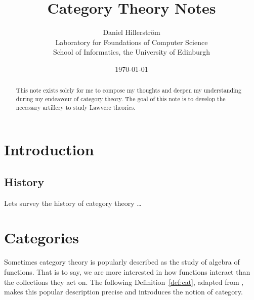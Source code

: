 \documentclass[10pt,twoside,a4paper]{article}
\author{Daniel Hillerström\\\small{Laboratory for Foundations of Computer Science}\\\small{School of Informatics, the University of Edinburgh}}
\title{\bfseries Category Theory Notes}
\date{\today}
\theoremstyle{plain}
\theoremstyle{definition}
\begin{document}
\maketitle
\begin{abstract}
  This note exists solely for me to compose my thoughts and deepen my
  understanding during my endeavour of category theory.  The goal of
  this note is to develop the necessary artillery to study Lawvere
  theories.
\end{abstract}

%
%
\setcounter{tocdepth}{2}
\tableofcontents

%
%
\section{Introduction}
\label{sec:intro}
\subsection{History}
Lets survey the history of category theory \dots

%
%
\section{Categories}
\label{sec:cats}

Sometimes category theory is popularly described as the study of
algebra of functions. That is to say, we are more interested in how
functions interact than the collections they act on. The following
Definition~\ref{def:cat}, adapted from \citet{Awodey11}, makes this
popular description precise and introduces the notion of category.
\end{document}
